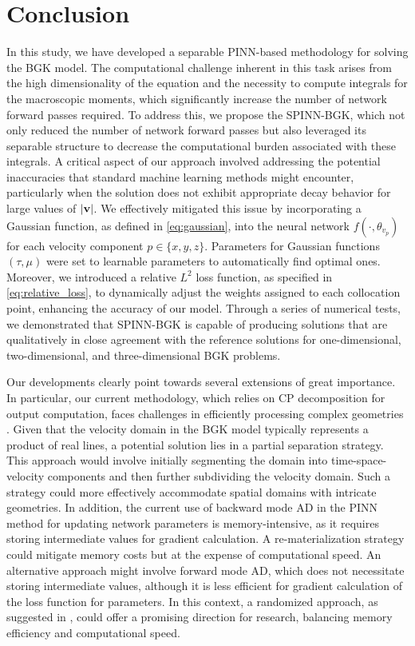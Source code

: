 \documentclass[preprint,12pt]{elsarticle}
\begin{document}
\section{Conclusion}\label{sec:conclusion}
In this study, we have developed a separable PINN-based methodology for solving the BGK model.
The computational challenge inherent in this task arises from the high dimensionality of the equation and the necessity to compute integrals for the macroscopic moments, which significantly increase the number of network forward passes required.
To address this, we propose the SPINN-BGK, which not only reduced the number of network forward passes but also leveraged its separable structure to decrease the computational burden associated with these integrals.
A critical aspect of our approach involved addressing the potential inaccuracies that standard machine learning methods might encounter, particularly when the solution does not exhibit appropriate decay behavior for large values of $|{\bf v}|$. We effectively mitigated this issue by incorporating a Gaussian function, as defined in \cref{eq:gaussian}, into the neural network $f(\cdot, \theta_{v_p})$ for each velocity component $p \in \{x,y,z\}$.
Parameters for Gaussian functions $(\tau, \mu)$ were set to learnable parameters to automatically find optimal ones.
Moreover, we introduced a relative $L^2$ loss function, as specified in \cref{eq:relative_loss}, to dynamically adjust the weights assigned to each collocation point, enhancing the accuracy of our model.
Through a series of numerical tests, we demonstrated that SPINN-BGK is capable of producing solutions that are qualitatively in close agreement with the reference solutions for one-dimensional, two-dimensional, and three-dimensional BGK problems.


Our developments clearly point towards several extensions of great importance.
In particular, our current methodology, which relies on CP decomposition for output computation, faces challenges in efficiently processing complex geometries \cite{lee2023finite}.
Given that the velocity domain in the BGK model typically represents a product of real lines, a potential solution lies in a partial separation strategy.
This approach would involve initially segmenting the domain into time-space-velocity components and then further subdividing the velocity domain.
Such a strategy could more effectively accommodate spatial domains with intricate geometries.
In addition, the current use of backward mode AD in the PINN method for updating network parameters is memory-intensive, as it requires storing intermediate values for gradient calculation.
A re-materialization strategy could mitigate memory costs but at the expense of computational speed.
An alternative approach might involve forward mode AD, which does not necessitate storing intermediate values, although it is less efficient for gradient calculation of the loss function for parameters.
In this context, a randomized approach, as suggested in \cite{shukla2023randomized}, could offer a promising direction for research, balancing memory efficiency and computational speed.
\end{document}

